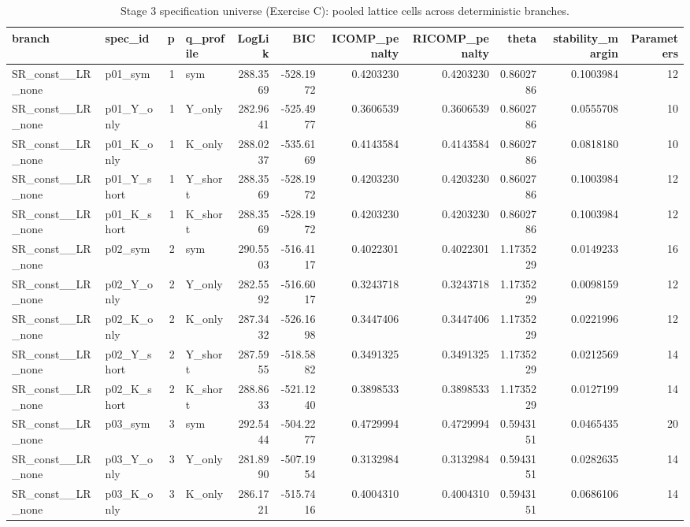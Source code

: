 \begin{table}[!h]
\centering
\caption{Stage 3 specification universe (Exercise C): pooled lattice cells across deterministic branches.}
\centering
\begin{tabular}[t]{llrlrrrrrrr}
\toprule
branch & spec\_id & p & q\_profile & LogLik & BIC & ICOMP\_penalty & RICOMP\_penalty & theta & stability\_margin & Parameters\\
\midrule
SR\_const\_\_LR\_none & p01\_sym & 1 & sym & 288.3569 & -528.1972 & 0.4203230 & 0.4203230 & 0.8602786 & 0.1003984 & 12\\
SR\_const\_\_LR\_none & p01\_Y\_only & 1 & Y\_only & 282.9641 & -525.4977 & 0.3606539 & 0.3606539 & 0.8602786 & 0.0555708 & 10\\
SR\_const\_\_LR\_none & p01\_K\_only & 1 & K\_only & 288.0237 & -535.6169 & 0.4143584 & 0.4143584 & 0.8602786 & 0.0818180 & 10\\
SR\_const\_\_LR\_none & p01\_Y\_short & 1 & Y\_short & 288.3569 & -528.1972 & 0.4203230 & 0.4203230 & 0.8602786 & 0.1003984 & 12\\
SR\_const\_\_LR\_none & p01\_K\_short & 1 & K\_short & 288.3569 & -528.1972 & 0.4203230 & 0.4203230 & 0.8602786 & 0.1003984 & 12\\
\addlinespace
SR\_const\_\_LR\_none & p02\_sym & 2 & sym & 290.5503 & -516.4117 & 0.4022301 & 0.4022301 & 1.1735229 & 0.0149233 & 16\\
SR\_const\_\_LR\_none & p02\_Y\_only & 2 & Y\_only & 282.5592 & -516.6017 & 0.3243718 & 0.3243718 & 1.1735229 & 0.0098159 & 12\\
SR\_const\_\_LR\_none & p02\_K\_only & 2 & K\_only & 287.3432 & -526.1698 & 0.3447406 & 0.3447406 & 1.1735229 & 0.0221996 & 12\\
SR\_const\_\_LR\_none & p02\_Y\_short & 2 & Y\_short & 287.5955 & -518.5882 & 0.3491325 & 0.3491325 & 1.1735229 & 0.0212569 & 14\\
SR\_const\_\_LR\_none & p02\_K\_short & 2 & K\_short & 288.8633 & -521.1240 & 0.3898533 & 0.3898533 & 1.1735229 & 0.0127199 & 14\\
\addlinespace
SR\_const\_\_LR\_none & p03\_sym & 3 & sym & 292.5444 & -504.2277 & 0.4729994 & 0.4729994 & 0.5943151 & 0.0465435 & 20\\
SR\_const\_\_LR\_none & p03\_Y\_only & 3 & Y\_only & 281.8990 & -507.1954 & 0.3132984 & 0.3132984 & 0.5943151 & 0.0282635 & 14\\
SR\_const\_\_LR\_none & p03\_K\_only & 3 & K\_only & 286.1721 & -515.7416 & 0.4004310 & 0.4004310 & 0.5943151 & 0.0686106 & 14\\

\end{tabular}
\end{table}
